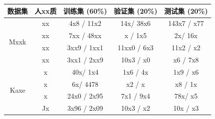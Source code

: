 \begin{table}[ht]\footnotesize
	\centering
	\label{tbl:text-dataset-stats}
	\begin{tabular}{c|c||ccc}
		\hline%
		\rowcolor{gray!15}
		数据集 & 人xx质 & 训练集 (60\%) & 验证集 (20\%) & 测试集 (20\%) \\
		\hline%
		\multirow{4}{*}{Mxxk} & xx & 4x8 / 11x2 & 14x/ 38x6 & 143x7 / x77 \\
		& xx & 7xx / 48xx& x / 1x5 & 2x/ 16x\\
		& xx & 3xx9 / 1xx1 & 11xx0 / 6x3 & 11x2 / x2 \\
		& xx & 3xx1 / 2xx9 & 10x3 / x0 & x6 / 7x8 \\
		\hline%
		\multirow{4}{*}{Kaxe} & x & 40x/ 1x4 & 1x6 / 4x & 1x9 / x6 \\
		& x & 6x/ 4478 & x2 / x & x8 / 1x\\
		& x & 24x0 / 2x95 & 7x1 / 9x4 & 78x/ x5 \\
		& Jx & 3x96 / 2x09 & 10x3 / x2 & 10x / x3 \\
		\hline%
	\end{tabular}
\end{table}




\vspace{20pt}

